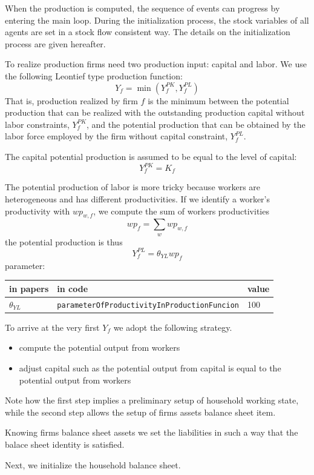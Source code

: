 \documentclass{book}
\begin{document}
When the production is computed, the sequence of events can progress by entering the main loop. During the initialization process, the stock variables of all agents are set in a stock flow consistent way.
The details on the initialization process are given hereafter.

To realize production firms need two production input: capital and labor. We use the following Leontief type production function:
\[
Y_f=\min(Y_f^{PK},Y_f^{PL})
\]
That is, production realized by firm $f$ is the minimum between the potential production that can be realized with the outstanding production capital without labor constraints, $Y_f^{PK}$, and the potential production that can be obtained by the labor force employed by the firm without capital constraint, $Y_f^{PL}$. 


The capital potential production is assumed to be equal to the level of capital:
\[
	Y^{PK}_f=K_f
\]

The potential production of labor is more tricky because workers are heterogeneous and has different productivities.
If we identify a worker's productivity with $wp_{w,f}$, we compute the sum of workers productivities
\[
	wp_f=\sum_{w}wp_{w,f}
\]
the potential production is thus
\[
	Y^{PL}_f=\theta_{YL}wp_f
\]
parameter:\\
\begin{tabular}{l l l}
	\hline
	in papers& in code&value\\
	\hline
	\hline
$\theta_{YL}$&\verb+parameterOfProductivityInProductionFuncion+&100\\
	\hline
\end{tabular}

\vskip5mm
To arrive at the very first $Y_f$ we adopt the following strategy. 
\begin{itemize}
	\item compute the potential output from workers
	\item adjust capital such as the potential output from capital is equal to the potential output from workers 
\end{itemize}

Note how the first step implies a preliminary setup of household working state, while the second step allows the setup of firms assets balance sheet item. 

Knowing firms balance sheet assets we set the liabilities in such a way that the balace sheet identity is satisfied.

Next, we initialize the household balance sheet.
\end{document}

